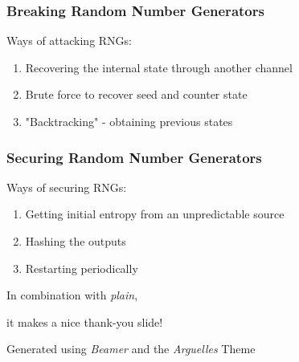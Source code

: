 \documentclass{beamer}
\begin{document}
  \begin{frame}
    \frametitle{Breaking Random Number Generators}

    Ways of attacking RNGs:
    \begin{enumerate}
        \item Recovering the internal state through another channel
        \item Brute force to recover seed and counter state
        \item "Backtracking" - obtaining previous states
    \end{enumerate}
    
  \end{frame}
  
  \begin{frame}
    \frametitle{Securing Random Number Generators}

    Ways of securing RNGs:
    \begin{enumerate}
        \item Getting initial entropy from an unpredictable source
        \item Hashing the outputs
        \item Restarting periodically
    \end{enumerate}
    
  \end{frame}

   
  \ThankYou
  \begin{frame}
    In combination with \textit{plain},\par
    it makes a nice thank-you slide!

    \vfill{Generated using \textit{Beamer} and the \textit{Arguelles} Theme}
  \end{frame}
\end{document}
